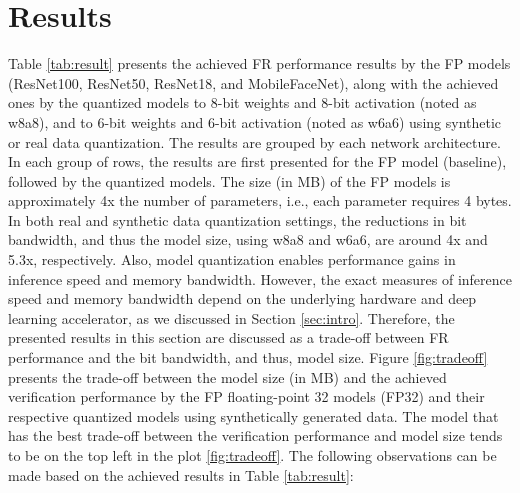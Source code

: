 \documentclass[a4paper,conference]{IEEEtran}
\begin{document}
\vspace{-1mm}
\section{Results}
\label{sec:result}
\vspace{-1mm}
Table \ref{tab:result} presents the achieved FR performance results by the FP models (ResNet100, ResNet50, ResNet18, and MobileFaceNet), along with the achieved ones by the quantized models to 8-bit weights and 8-bit activation (noted as w8a8), and to  6-bit weights and 6-bit activation (noted as w6a6) using synthetic or real data quantization. The results are grouped by each network architecture. In each group of rows, the results are first presented for the FP model (baseline), followed by the quantized models.  
The size (in MB) of the FP models is approximately 4x the number of parameters, i.e., each parameter requires 4 bytes.
In both real and synthetic data quantization settings, the reductions in bit bandwidth, and thus the model size, using w8a8 and w6a6, are around 4x and 5.3x, respectively. Also, model quantization enables performance gains in inference speed and memory bandwidth. However, the exact measures of inference speed and memory bandwidth depend on the underlying hardware and deep learning accelerator, as we discussed in Section \ref{sec:intro}.   Therefore, the presented results in this section are discussed as a trade-off between FR performance and the bit bandwidth, and thus, model size.
Figure \ref{fig:tradeoff} presents the trade-off between the model size (in MB) and the achieved verification performance by the FP floating-point 32 models (FP32) and their respective quantized models using synthetically generated data. 
The model that has the best trade-off between the verification performance and model size tends to be on the top left in the plot \ref{fig:tradeoff}.
The following observations can be made based on the achieved results in Table \ref{tab:result}:

\vspace{-1mm}
\end{document}
